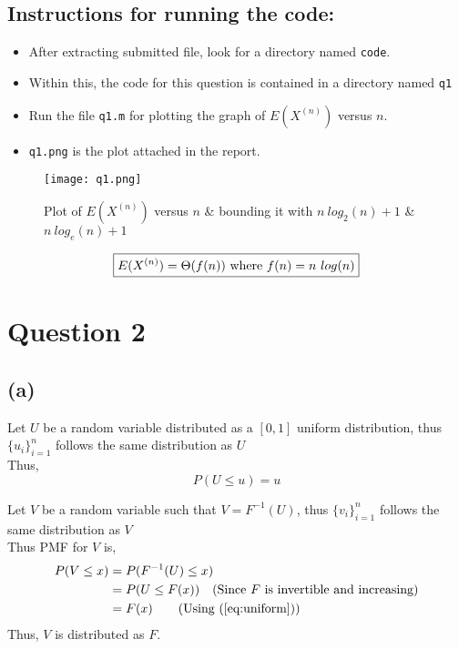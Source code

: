 \documentclass[11pt, fleqn]{article}
\begin{document}
\subsection*{Instructions for running the code:}
\begin{itemize}
    \item After extracting submitted file, look for a directory named \texttt{code}.
    \item Within this, the code for this question is contained in a directory named \texttt{q1}
    \item Run the file \texttt{q1.m} for plotting the graph of $E(X^{(n)})$ versus $n$.
    \item \texttt{q1.png} is the plot attached in the report.
\end{itemize}
\begin{figure}[H]
    \centering
    \texttt{[image: q1.png]}
    \caption{Plot of $E(X^{(n)})$ versus $n$ \& bounding it with $n\  log_2 (n) + 1$ \& $n\ log_e (n) + 1$}
\end{figure}
\vspace{3em}
$$\boxed{E(X^{(n)}) = \Theta(f(n))$ where $f(n) = n\ log(n)}$$


\newpage
\section*{Question 2}
\setcounter{equation}{0}

\subsection*{(a)}
Let $U$ be a random variable distributed as a $[0,1]$ uniform distribution, thus $\{u_i\}^{n}_{i=1}$ follows the same distribution as $U$\\
Thus,
\begin{equation}
    \label{eq:uniform}
     P(U \le u) = u 
\end{equation}

Let $V$ be a random variable such that $V = F^{-1}(U)$, thus $\{v_i\}^{n}_{i=1}$ follows the same distribution as $V$  \\
Thus PMF for $V$ is,
$$
\begin{aligned}
    P(V \le x) &= P(F^{-1}(U) \le x)\\
    &= P(U \le F(x)) \hspace{1em} \text{(Since $F$ is invertible and increasing)}\\
    &= F(x) \hspace{2em} \text{(Using (\ref{eq:uniform}))}
\end{aligned}
$$
Thus, $V$ is distributed as $F$.
\end{document}
